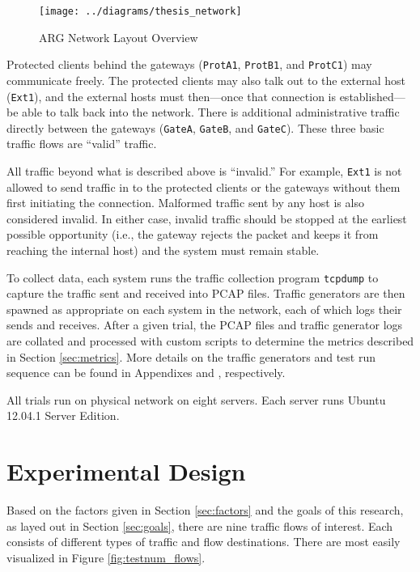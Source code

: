 \begin{figure}
	\centering
	\caption{ARG Network Layout Overview }
	\label{fig:argnetwork}
	\texttt{[image: ../diagrams/thesis\_network]}
\end{figure}

\par Protected clients behind the gateways (\texttt{ProtA1}, \texttt{ProtB1}, and \texttt{ProtC1}) may communicate freely. The protected clients may also talk out to the external host (\texttt{Ext1}), and the external hosts must then---once that connection is established---be able to talk back into the network. There is additional administrative traffic directly between the gateways (\texttt{GateA}, \texttt{GateB}, and \texttt{GateC}). These three basic traffic flows are ``valid'' traffic.

\par All traffic beyond what is described above is ``invalid.'' For example, \texttt{Ext1} is not allowed to send traffic in to the protected clients or the gateways without them first initiating the connection. Malformed traffic sent by any host is also considered invalid. In either case, invalid traffic should be stopped at the earliest possible opportunity (i.e., the gateway rejects the packet and keeps it from reaching the internal host) and the system must remain stable.

\par To collect data, each system runs the traffic collection program \texttt{tcpdump} to capture the traffic sent and received into \ac{PCAP} files. Traffic generators are then spawned as appropriate on each system in the network, each of which logs their sends and receives. After a given trial, the \ac{PCAP} files and traffic generator logs are collated and processed with custom scripts to determine the metrics described in Section \ref{sec:metrics}. More details on the traffic generators and test run sequence can be found in Appendixes  and , respectively.

\par {}

\par All trials run on physical network on eight servers. Each server runs Ubuntu 12.04.1 Server Edition.

\section{Experimental Design}
\label{sec:exp_design}
\par Based on the factors given in Section \ref{sec:factors} and the goals of this research, as layed out in Section \ref{sec:goals}, there are nine traffic flows of interest. Each consists of different types of traffic and flow destinations. There are most easily visualized in Figure \ref{fig:testnum_flows}.

